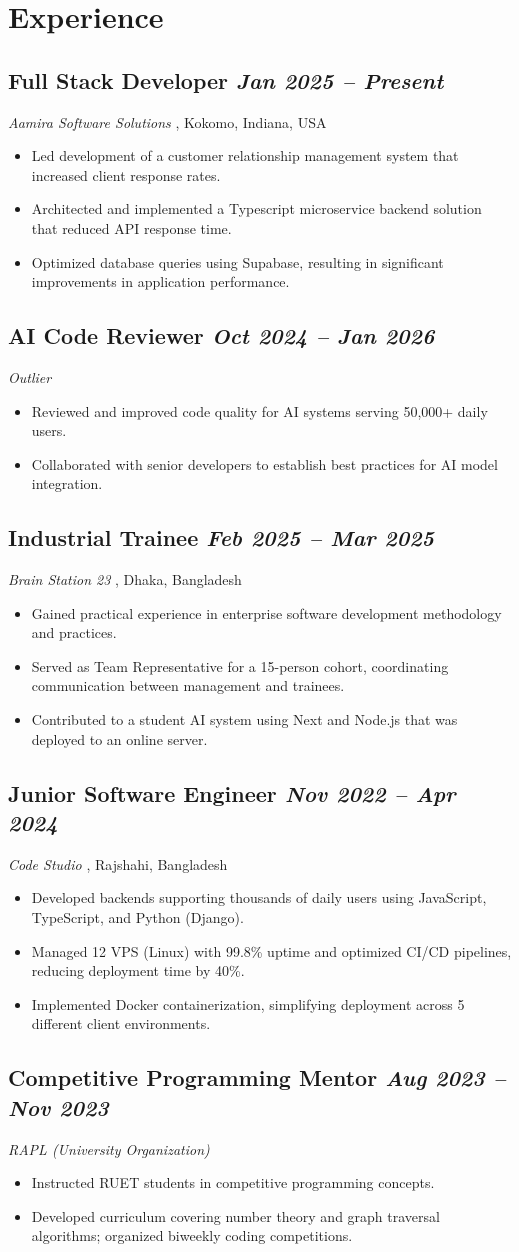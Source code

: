 \documentclass[10pt, a4paper]{article}
\newcommand{\urlAamira}{https://aamira.ca/}
\newcommand{\urlOutlier}{https://www.linkedin.com/company/try-outlier/}
\newcommand{\urlBrainStation}{https://brainstation-23.com/}
\newcommand{\urlCodeStudio}{https://www.linkedin.com/company/code-studio4/}
\newcommand{\datedsubsection}[2]{%
  \subsection*{#1 \hfill \small\textit{#2}}%
}
\newcommand{\resitem}[1]{\item #1} %
\begin{document}
\section{Experience}
\datedsubsection{Full Stack Developer}{Jan 2025 -- Present}
\textit{Aamira Software Solutions} \href{\urlAamira}{\small\faExternalLink*}, Kokomo, Indiana, USA
\begin{itemize}
    \resitem{Led development of a customer relationship management system that increased client response rates.}
    \resitem{Architected and implemented a Typescript microservice backend solution that reduced API response time.}
    \resitem{Optimized database queries using Supabase, resulting in significant improvements in application performance.}
\end{itemize}
\datedsubsection{AI Code Reviewer}{Oct 2024 -- Jan 2026}
\textit{Outlier} \href{\urlOutlier}{\small\faExternalLink*}
\begin{itemize}
    \resitem{Reviewed and improved code quality for AI systems serving 50,000+ daily users.}
    \resitem{Collaborated with senior developers to establish best practices for AI model integration.}
\end{itemize}
\datedsubsection{Industrial Trainee}{Feb 2025 -- Mar 2025}
\textit{Brain Station 23} \href{\urlBrainStation}{\small\faExternalLink*}, Dhaka, Bangladesh
\begin{itemize}
    \resitem{Gained practical experience in enterprise software development methodology and practices.}
    \resitem{Served as Team Representative for a 15-person cohort, coordinating communication between management and trainees.}
    \resitem{Contributed to a student AI system using Next and Node.js that was deployed to an online server.}
\end{itemize}
\datedsubsection{Junior Software Engineer}{Nov 2022 -- Apr 2024}
\textit{Code Studio} \href{\urlCodeStudio}{\small\faExternalLink*}, Rajshahi, Bangladesh
\begin{itemize}
    \resitem{Developed backends supporting thousands of daily users using JavaScript, TypeScript, and Python (Django).}
    \resitem{Managed 12 VPS (Linux) with 99.8\% uptime and optimized CI/CD pipelines, reducing deployment time by 40\%.}
    \resitem{Implemented Docker containerization, simplifying deployment across 5 different client environments.}
\end{itemize}
\datedsubsection{Competitive Programming Mentor}{Aug 2023 -- Nov 2023}
\textit{RAPL (University Organization)}
\begin{itemize}
    \resitem{Instructed RUET students in competitive programming concepts.}
    \resitem{Developed curriculum covering number theory and graph traversal algorithms; organized biweekly coding competitions.}
\end{itemize}
\end{document}
